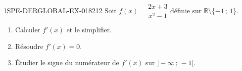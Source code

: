 \begin{exercice}{1SPE-DERGLOBAL-EX-018}{2}{12}
Soit $f(x) = \dfrac{2x+3}{x^2-1}$ définie sur $\mathbb{R} \setminus \{-1\,;\,1\}$.
\begin{enumerate}
  \item Calculer $f'(x)$ et le simplifier.
  \item Résoudre $f'(x) = 0$.
  \item Étudier le signe du numérateur de $f'(x)$ sur $]-\infty\,;\,-1[$.
\end{enumerate}
\end{exercice}
